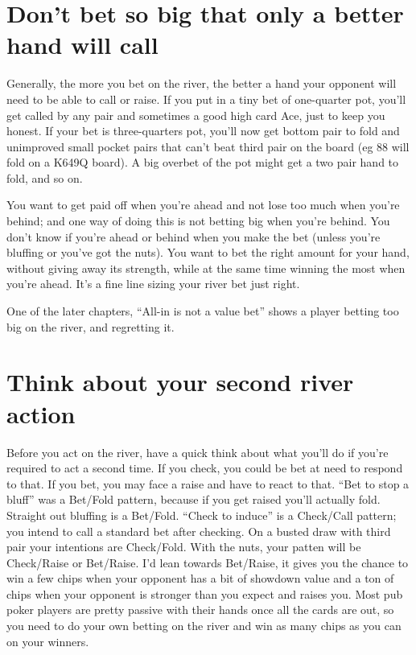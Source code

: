 \section{Don't bet so big that only a better hand will call}

Generally, the more you bet on the river, the better a hand your
opponent will need to be able to call or raise. If you put in
a tiny bet of one-quarter pot, you'll get called by any pair and
sometimes a good high card Ace, just to keep you honest. If your
bet is three-quarters pot, you'll now get bottom pair to fold
and unimproved small pocket pairs that can't beat third pair on the
board (eg 88 will fold on a K649Q board). A big overbet of the pot
might get a two pair hand to fold, and so on.

You want to get paid off when you're ahead and not lose too much
when you're behind; and one way of doing this is not betting big when
you're behind. You don't know if you're ahead or behind when you
make the bet (unless you're bluffing or you've got the nuts). You
want to bet the right amount for your hand, without giving away
its strength, while at the same time winning the most when you're ahead.
It's a fine line sizing your river bet just right.

One of the later chapters, ``All-in is not a value bet'' shows a
player betting too big on the river, and regretting it.

\section{Think about your second river action}

Before you act on the river, have a quick think about what you'll
do if you're required to act a second time. If you check, you could
be bet at need to respond to that. If you bet, you may face a raise
and have to react to that. ``Bet to stop a bluff'' was a Bet/Fold
pattern, because if you get raised you'll actually fold. Straight out
bluffing is a Bet/Fold. ``Check to induce'' is a Check/Call pattern;
you intend to call a standard bet after checking. On a busted draw
with third pair your intentions are Check/Fold. With the nuts, your
patten will be Check/Raise or Bet/Raise. I'd lean towards Bet/Raise,
it gives you the chance to win a few chips when your opponent has a
bit of showdown value and a ton of chips when your opponent is
stronger than you expect and raises you. Most pub poker players are
pretty passive with their hands once all the cards are out, so you
need to do your own betting on the river and win as many chips as you
can on your winners.

